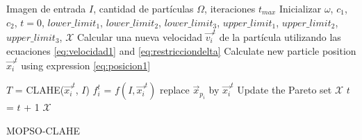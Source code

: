 \begin{algorithm}[H]
\scriptsize
\begin{algorithmic}[1]
\Require Imagen de entrada $I$, cantidad de partículas $\Omega$, iteraciones $t_{max}$ 
\State Inicializar $\omega$, $c_1$, $c_2$, $t=0$, $lower\_limit_1$, $lower\_limit_2$, $lower\_limit_3$, $upper\_limit_1$, $upper\_limit_2$, $upper\_limit_3$, $\mathscr{X}$
        \State Calcular una nueva velocidad $\overrightarrow{v_i}^t$ de la partícula utilizando las ecuaciones \eqref{eq:velocidad1} and \eqref{eq:restricciondelta}
        \State Calculate new particle position $\overrightarrow{x_i}^t$ using expression \eqref{eq:posicion1}

        \State ${T}$ = CLAHE(${\overrightarrow{x_i}^t}$, ${I}$)
                \State ${f^t_i}$ = $f(I, \overrightarrow{x_i}^t)$%
                \State replace $\overrightarrow{x}_{p_i}$ by $\overrightarrow{x_i}^t$
                \EndIf
                \State Update the Pareto set $\mathscr{X}$
                \EndIf
                \State $t$ = $t$ + 1
                \EndFor
                \EndWhile
                \Ensure $\mathscr{X}$
                \end{algorithmic}
                \caption{MOPSO-CLAHE}
                \label{alg:pso_clahe}
                \end{algorithm}

